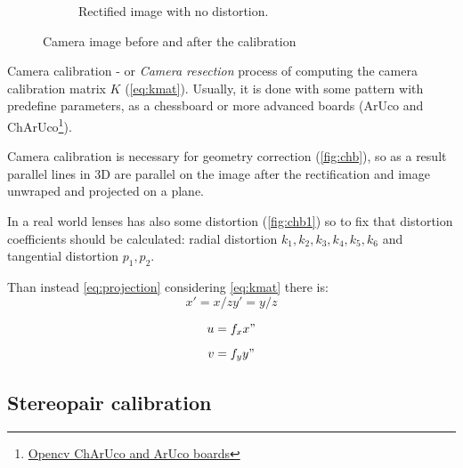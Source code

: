 \begin{figure}[!hp]
\begin{subfigure}[b]{0.45\textwidth}
      \caption{Rectified image with no distortion.}
      \label{fig:chb2}
    \end{subfigure}
    \caption{Camera image before and after the calibration}
    \label{fig:chb}
\end{figure}

Camera calibration - or \textit{Camera resection} process of computing the camera calibration matrix $K$ (\autoref{eq:kmat}).
Usually, it is done with some pattern with predefine parameters, as a chessboard or more advanced boards (ArUco and ChArUco\footnote{\href{https://docs.opencv.org/4.x/df/d4a/tutorial_charuco_detection.html}{Opencv ChArUco and ArUco boards}}).

Camera calibration is necessary for geometry correction (\autoref{fig:chb}), so as a result parallel lines in 3D are parallel on the image after the rectification and image unwraped and projected on a plane.

In a real world lenses has also some distortion (\autoref{fig:chb1}) so to fix that distortion coefficients should be calculated: radial distortion $k_1, k_2, k_3, k_4, k_5, k_6$ and tangential distortion $p_1, p_2$.

Than instead \autoref{eq:projection} considering \autoref{eq:kmat} there is:
\begin{equation}
    x' = x/z
    y' = y/z
\end{equation}
    
\begin{equation}
    u = f_x x"
\end{equation}
\begin{equation}
    v = f_y y"
\end{equation}
\subsection{Stereopair calibration}
